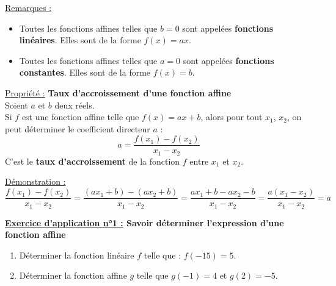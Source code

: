 \documentclass[12pt]{article}
\begin{document}
\vspace{10pt}

\underline{Remarques :}
\vspace{5pt}
\begin{itemize}
    \item Toutes les fonctions affines telles que $b = 0$ sont appelées \textbf{fonctions linéaires}.
    Elles sont de la forme $f(x) = ax$.
    \item Toutes les fonctions affines telles que $a = 0$ sont appelées \textbf{fonctions constantes}.
    Elles sont de la forme $f(x) = b$.
\end{itemize}

\vspace{10pt}

\begin{mdframed}[
    linewidth=1pt,
    roundcorner=5pt,
    linecolor=Red,
    innertopmargin=10pt,
    innerbottommargin=10pt
]
{\color{red}
\underline{Propriété :} \textbf{Taux d'accroissement d'une fonction affine}
\vspace{5pt}
\\Soient $a$ et $b$ deux réels.
\\Si $f$ est une fonction affine telle que $f(x) = ax + b$, alors pour tout $x_1$, $x_2$, on peut
déterminer le coefficient directeur $a$ :
\[
a = \dfrac{f(x_1) - f(x_2)}{x_1 - x_2}
\]
C'est le \textbf{taux d'accroissement} de la fonction $f$ entre $x_1$ et $x_2$.
}
\end{mdframed}

\underline{Démonstration :}
\vspace{5pt}
\\$\dfrac{f(x_1) - f(x_2)}{x_1 - x_2} = \dfrac{(ax_1 + b) - (ax_2 + b)}{x_1 - x_2}
= \dfrac{ax_1 + b - ax_2 - b}{x_1 - x_2} = \dfrac{a(x_1 - x_2)}{x_1 - x_2} = a$

\vspace{10pt}

\begin{mdframed}[
    linewidth=1pt,
    roundcorner=5pt,
    linecolor=RoyalBlue,
    innertopmargin=10pt,
    innerbottommargin=10pt
]
{\color{RoyalBlue}\textbf{\underline{Exercice d'application n°1 :} Savoir déterminer l'expression d'une fonction
affine}
\vspace{5pt}
\begin{enumerate}
    \item Déterminer la fonction linéaire $f$ telle que : $f(-15) = 5$.
    \item Déterminer la fonction affine $g$ telle que $g(-1) = 4$ et $g(2) = -5$.
\end{enumerate}
}
\end{mdframed}
\end{document}
